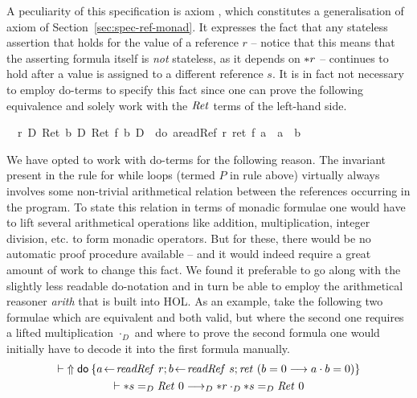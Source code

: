 A peculiarity of this specification is axiom , which
constitutes a generalisation of axiom  of
Section~\ref{sec:spec-ref-monad}. It expresses the fact that any stateless
assertion that holds for the value of a reference $r$ -- notice that this
means that the asserting formula itself is \emph{not} stateless, as it depends
on ${\ast r}$ -- continues to hold after a value is assigned to a  different
reference $s$. It is in fact not necessary to employ do-terms to specify this
fact since one can prove the following equivalence and solely work with the
$\mathit{Ret}$ terms of the left-hand side.
\begin{isabellebody}
\isanewline
{}\ {\isachardoublequote}{\isasymturnstile}\ {\isacharasterisk}r\ {\isacharequal}\isactrlsub D\ Ret\ b\ {\isasymand}\isactrlsub D\ Ret\ {\isacharparenleft}f\ b{\isacharparenright}\ {\isasymlongleftrightarrow}\isactrlsub D\ {\isasymUp}\ {\isacharparenleft}do\ {\isacharbraceleft}a{\isasymleftarrow}readRef\ r{\isacharsemicolon}\ ret\ {\isacharparenleft}f\ a\ {\isasymand}\ a\ {\isacharequal}\ b{\isacharparenright}{\isacharbraceright}{\isacharparenright}{\isachardoublequote}\isamarkupfalse%
\isanewline
\end{isabellebody}

\begin{rem}
  We have opted to work with do-terms for the following reason. The invariant
  present in the rule for while loops (termed $P$ in rule 
  above) virtually always involves some non-trivial arithmetical relation
  between the references occurring in the program. To state this relation in
  terms of monadic formulae one would have to lift several arithmetical
  operations like addition, multiplication, integer division, etc. to form
  monadic operators. But for these, there would be no automatic proof procedure
  available -- and it would indeed require a great amount of work to change this
  fact. We found it preferable to go along with the slightly less readable
  do-notation and in turn be able to employ the arithmetical reasoner
  \emph{arith} that is built into HOL. As an example, take the following two
  formulae which are equivalent and both valid, but where the second one
  requires a lifted multiplication $\cdot_D$ and where to prove the second
  formula one would initially have to decode it into the first formula manually.
  \begin{gather*}
    \vdash {\Uparrow\mathsf{do}\: \{a\!\gets\!\mathit{readRef}\ r; b\!\gets\!\mathit{readRef}\ s; \mathit{ret}~(b = 0 \longrightarrow
        a \cdot b = 0)\}} \\
    \vdash {\ast s} =_D \mathit{Ret}~0 \longrightarrow_D {\ast r} \cdot_D {\ast s} =_D \mathit{Ret}~0
  \end{gather*}
\end{rem}


